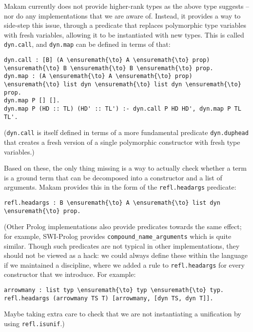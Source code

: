 Makam currently does not provide higher-rank types as the above type
suggests -- nor do any \lamprolog implementations that we are aware of.
Instead, it provides a way to side-step this issue, through a predicate
that replaces polymorphic type variables with fresh variables, allowing
it to be instantiated with new types. This is called \texttt{dyn.call},
and \texttt{dyn.map} can be defined in terms of that:

\begin{verbatim}
dyn.call : [B] (A \ensuremath{\to} A \ensuremath{\to} prop) \ensuremath{\to} B \ensuremath{\to} B \ensuremath{\to} prop.
dyn.map : (A \ensuremath{\to} A \ensuremath{\to} prop) \ensuremath{\to} list dyn \ensuremath{\to} list dyn \ensuremath{\to} prop.
dyn.map P [] [].
dyn.map P (HD :: TL) (HD' :: TL') :- dyn.call P HD HD', dyn.map P TL TL'.
\end{verbatim}

(\texttt{dyn.call} is itself defined in terms of a more fundamental
predicate \texttt{dyn.duphead} that creates a fresh version of a single
polymorphic constructor with fresh type variables.)

Based on these, the only thing missing is a way to actually check
whether a term is a ground term that can be decomposed into a
constructor and a list of arguments. Makam provides this in the form of
the \texttt{refl.headargs} predicate:

\begin{verbatim}
refl.headargs : B \ensuremath{\to} A \ensuremath{\to} list dyn \ensuremath{\to} prop.
\end{verbatim}

(Other Prolog implementations also provide predicates towards the same
effect; for example, SWI-Prolog provides
\texttt{compound\_name\_arguments} which is quite similar. Though such
predicates are not typical in other \lamprolog implementations, they
should not be viewed as a hack: we could always define these within the
language if we maintained a discipline, where we added a rule to
\texttt{refl.headargs} for every constructor that we introduce. For
example:

\begin{verbatim}
arrowmany : list typ \ensuremath{\to} typ \ensuremath{\to} typ.
refl.headargs (arrowmany TS T) [arrowmany, [dyn TS, dyn T]].
\end{verbatim}

Maybe taking extra care to check that we are not instantiating a
unification by using \texttt{refl.isunif}.)

